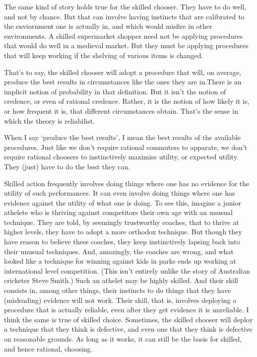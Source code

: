 \documentclass[
  11pt,
  letterpaper,
  DIV=11,
  numbers=noendperiod,
  oneside]{scrartcl}
\begin{document}
The same kind of story holds true for the skilled chooser. They have to
do well, and not by chance. But that can involve having instincts that
are calibrated to the enviornment one is actually in, and which would
misfire in other environments. A skilled supermarket shopper need not be
applying procedures that would do well in a medieval market. But they
must be applying procedures that will keep working if the shelving of
various items is changed.

That's to say, the skilled chooser will adopt a procedure that will, on
average, produce the best results in circumstances like the ones they
are in.There is an implicit notion of probability in that definition.
But it isn't the notion of credence, or even of rational credence.
Rather, it is the notion of how likely it is, or how frequent it is,
that different circumstances obtain. That's the sense in which the
theory is reliabilist.

When I say `produce the best results', I mean the best results of the
available procedures. Just like we don't require rational commuters to
apparate, we don't require rational choosers to instinctively maximise
utility, or expected utility. They (just) have to do the best they can.

Skilled action frequently involves doing things where one has no
evidence for the utility of such performances. It can even involve doing
things where one has evidence against the utility of what one is doing.
To see this, imagine a junior athelete who is thriving against
competitors their own age with an unusual technique. They are told, by
seemingly trustworthy coaches, that to thrive at higher levels, they
have to adopt a more orthodox technique. But though they have reason to
believe these coaches, they keep instinctively lapsing back into their
unusual techniques. And, amazingly, the coaches are wrong, and what
looked like a technique for winning against kids in parks ends up
working at international level competition. (This isn't entirely unlike
the story of Australian cricketer Steve Smith.) Such an athelet may be
highly skilled. And their skill consists in, among other things, their
instincts to do things that they have (misleading) evidence will not
work. Their skill, that is, involves deploying a procedure that is
actually reliable, even after they get evidence it is unreliable. I
think the same is true of skilled choice. Sometimes, the skilled chooser
will deploy a technique that they think is defective, and even one that
they think is defective on reasonable grounds. As long as it works, it
can still be the basis for skilled, and hence rational, choosing.
\end{document}
